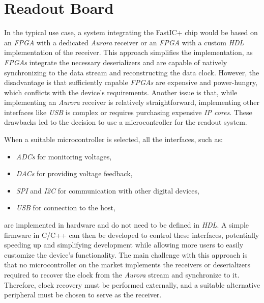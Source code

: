 \chapter{Readout Board}
In the typical use case, a system integrating the FastIC+ chip would be based on an \emph{FPGA} with a dedicated \emph{Aurora} receiver or an \emph{FPGA} with a custom \emph{HDL} implementation of the receiver. This approach simplifies the implementation, as \emph{FPGAs} integrate the necessary deserializers and are capable of natively synchronizing to the data stream and reconstructing the data clock. However, the disadvantage is that sufficiently capable \emph{FPGAs} are expensive and power-hungry, which conflicts with the device's requirements. Another issue is that, while implementing an \emph{Aurora} receiver is relatively straightforward, implementing other interfaces like \emph{USB} is complex or requires purchasing expensive \emph{IP cores}. These drawbacks led to the decision to use a microcontroller for the readout system.

When a suitable microcontroller is selected, all the interfaces, such as:
\begin{itemize}
    \item \emph{ADCs} for monitoring voltages,
    \item \emph{DACs} for providing voltage feedback,
    \item \emph{SPI} and \emph{I2C} for communication with other digital devices,
    \item \emph{USB} for connection to the host,
\end{itemize}
are implemented in hardware and do not need to be defined in \textit{HDL}. A simple firmware in C/C++ can then be developed to control these interfaces, potentially speeding up and simplifying development while allowing more users to easily customize the device's functionality. The main challenge with this approach is that no microcontroller on the market implements the receivers or deserializers required to recover the clock from the \emph{Aurora} stream and synchronize to it. Therefore, clock recovery must be performed externally, and a suitable alternative peripheral must be chosen to serve as the receiver.


